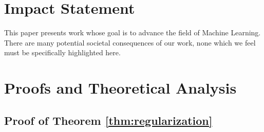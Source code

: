 \documentclass{article}
\theoremstyle{plain}
\theoremstyle{definition}
\theoremstyle{remark}
\begin{document}
\section*{Impact Statement}
This paper presents work whose goal is to advance the field of Machine Learning. 
There are many potential societal consequences of our work, none which we feel must be specifically highlighted here.




\newpage
\appendix
\onecolumn
\section{Proofs and Theoretical Analysis}
\label{sec:appendix_proof}

\subsection{Proof of Theorem \ref{thm:regularization}}
\end{document}
